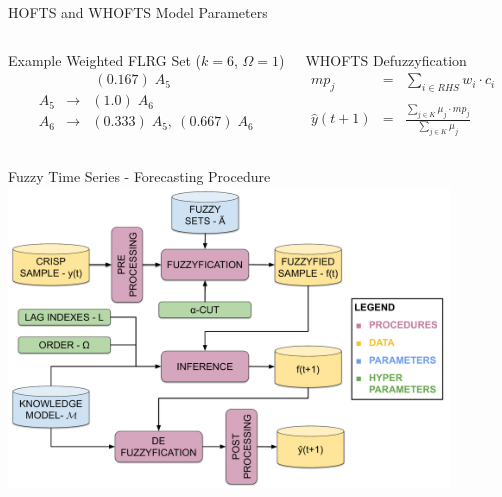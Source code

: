 \documentclass{beamer}
\begin{document}
\begin{frame}{HOFTS and WHOFTS Model Parameters}
\begin{columns}
\begin{block}{Example Weighted FLRG Set ($k=6$, $\Omega=1$)}
$$\begin{array}{rcl}
& & \  (0.167)\; A_5 \\
A_5  & \rightarrow &  (1.0)\; A_6 \\
A_6  & \rightarrow &  (0.333)\; A_5,\  (0.667)\; A_6 \\
\end{array}
$$
\end{block}
\begin{block}{WHOFTS Defuzzyfication}
$$
\begin{array}{rcl}
     mp_j & = & \sum_{i \in RHS} w_i \cdot c_i  \\
     \\
     \displaystyle \hat{y}(t+1) & = &  \displaystyle \frac{\sum_{j \in K} \mu_j \cdot mp_j}{\sum_{j \in K} \mu_j}
\end{array}
$$
\end{block}
\end{columns}
\end{frame}



\begin{frame}{Fuzzy Time Series - Forecasting Procedure}
\includegraphics[width=\textwidth,height=8cm]{figures/fts_forecasting.pdf}
\end{frame}
\end{document}
